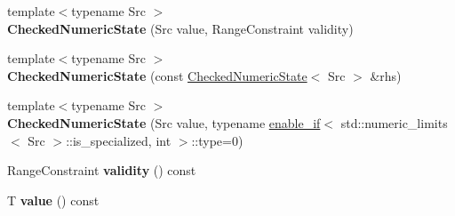 \begin{DoxyCompactItemize}
\item 
{\footnotesize template$<$typename Src $>$ }\\{\bfseries Checked\+Numeric\+State} (Src value, Range\+Constraint validity)\hypertarget{classv8_1_1base_1_1internal_1_1_checked_numeric_state_3_01_t_00_01_n_u_m_e_r_i_c___i_n_t_e_g_e_r_01_4_ad28239c47fe6bb23981cba9ca1aa85e0}{}\label{classv8_1_1base_1_1internal_1_1_checked_numeric_state_3_01_t_00_01_n_u_m_e_r_i_c___i_n_t_e_g_e_r_01_4_ad28239c47fe6bb23981cba9ca1aa85e0}

\item 
{\footnotesize template$<$typename Src $>$ }\\{\bfseries Checked\+Numeric\+State} (const \hyperlink{classv8_1_1base_1_1internal_1_1_checked_numeric_state}{Checked\+Numeric\+State}$<$ Src $>$ \&rhs)\hypertarget{classv8_1_1base_1_1internal_1_1_checked_numeric_state_3_01_t_00_01_n_u_m_e_r_i_c___i_n_t_e_g_e_r_01_4_a0df9c94921b36e5155b7e49179c72d11}{}\label{classv8_1_1base_1_1internal_1_1_checked_numeric_state_3_01_t_00_01_n_u_m_e_r_i_c___i_n_t_e_g_e_r_01_4_a0df9c94921b36e5155b7e49179c72d11}

\item 
{\footnotesize template$<$typename Src $>$ }\\{\bfseries Checked\+Numeric\+State} (Src value, typename \hyperlink{structv8_1_1base_1_1internal_1_1enable__if}{enable\+\_\+if}$<$ std\+::numeric\+\_\+limits$<$ Src $>$\+::is\+\_\+specialized, int $>$\+::type=0)\hypertarget{classv8_1_1base_1_1internal_1_1_checked_numeric_state_3_01_t_00_01_n_u_m_e_r_i_c___i_n_t_e_g_e_r_01_4_a379f680bb18c028b5bbbd1c4ba51a0e4}{}\label{classv8_1_1base_1_1internal_1_1_checked_numeric_state_3_01_t_00_01_n_u_m_e_r_i_c___i_n_t_e_g_e_r_01_4_a379f680bb18c028b5bbbd1c4ba51a0e4}

\item 
Range\+Constraint {\bfseries validity} () const \hypertarget{classv8_1_1base_1_1internal_1_1_checked_numeric_state_3_01_t_00_01_n_u_m_e_r_i_c___i_n_t_e_g_e_r_01_4_affd68983001e8898965fc5b195e3a890}{}\label{classv8_1_1base_1_1internal_1_1_checked_numeric_state_3_01_t_00_01_n_u_m_e_r_i_c___i_n_t_e_g_e_r_01_4_affd68983001e8898965fc5b195e3a890}

\item 
T {\bfseries value} () const \hypertarget{classv8_1_1base_1_1internal_1_1_checked_numeric_state_3_01_t_00_01_n_u_m_e_r_i_c___i_n_t_e_g_e_r_01_4_a49a5c8aab15593b25861f9cd3478fb54}{}\label{classv8_1_1base_1_1internal_1_1_checked_numeric_state_3_01_t_00_01_n_u_m_e_r_i_c___i_n_t_e_g_e_r_01_4_a49a5c8aab15593b25861f9cd3478fb54}

\end{DoxyCompactItemize}
